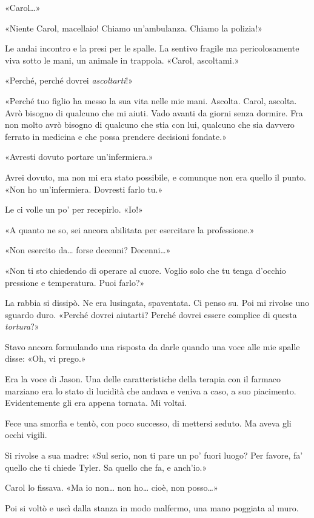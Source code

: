 «Carol\ldots»

«Niente Carol, macellaio! Chiamo un'ambulanza. Chiamo la polizia!»

Le andai incontro e la presi per le spalle. La sentivo fragile ma
pericolosamente viva sotto le mani, un animale in trappola. «Carol,
ascoltami.»

«Perché, perché dovrei \emph{ascoltarti}!»

«Perché tuo figlio ha messo la sua vita nelle mie mani. Ascolta. Carol,
ascolta. Avrò bisogno di qualcuno che mi aiuti. Vado avanti da giorni
senza dormire. Fra non molto avrò bisogno di qualcuno che stia con lui,
qualcuno che sia davvero ferrato in medicina e che possa prendere
decisioni fondate.»

«Avresti dovuto portare un'infermiera.»

Avrei dovuto, ma non mi era stato possibile, e comunque non era quello
il punto. «Non ho un'infermiera. Dovresti farlo tu.»

Le ci volle un po' per recepirlo. «Io!»

«A quanto ne so, sei ancora abilitata per esercitare la professione.»

«Non esercito da\ldots{} forse decenni? Decenni\ldots»

«Non ti sto chiedendo di operare al cuore. Voglio solo che tu tenga
d'occhio pressione e temperatura. Puoi farlo?»

La rabbia si dissipò. Ne era lusingata, spaventata. Ci penso su. Poi mi
rivolse uno sguardo duro. «Perché dovrei aiutarti? Perché dovrei essere
complice di questa \emph{tortura}?»

Stavo ancora formulando una risposta da darle quando una voce alle mie
spalle disse: «Oh, vi prego.»

Era la voce di Jason. Una delle caratteristiche della terapia con il
farmaco marziano era lo stato di lucidità che andava e veniva a caso, a
suo piacimento. Evidentemente gli era appena tornata. Mi voltai.

Fece una smorfia e tentò, con poco successo, di mettersi seduto. Ma
aveva gli occhi vigili.

Si rivolse a sua madre: «Sul serio, non ti pare un po' fuori luogo? Per
favore, fa' quello che ti chiede Tyler. Sa quello che fa, e anch'io.»

Carol lo fissava. «Ma io non\ldots{} non ho\ldots{} cioè, non
posso\ldots»

Poi si voltò e uscì dalla stanza in modo malfermo, una mano poggiata al
muro.

